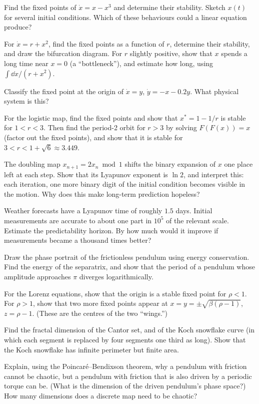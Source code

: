 \begin{problems}
\core Find the fixed points of $\dot x = x - x^3$ and determine their stability. Sketch $x(t)$ for several initial conditions. Which of these behaviours could a linear equation produce?

 For $\dot x = r + x^2$, find the fixed points as a function of $r$, determine their stability, and draw the bifurcation diagram. For $r$ slightly positive, show that $x$ spends a long time near $x = 0$ (a ``bottleneck''), and estimate how long, using $\int\dd x/(r+x^2)$.

 Classify the fixed point at the origin of $\dot x = y$, $\dot y = -x - 0.2y$. What physical system is this?

\core For the logistic map, find the fixed points and show that $x^* = 1-1/r$ is stable for $1<r<3$. Then find the period-2 orbit for $r>3$ by solving $F(F(x)) = x$ (factor out the fixed points), and show that it is stable for $3<r<1+\sqrt6\approx3.449$.

 The doubling map $x_{n+1} = 2x_n \bmod 1$ shifts the binary expansion of $x$ one place left at each step. Show that its Lyapunov exponent is $\ln 2$, and interpret this: each iteration, one more binary digit of the initial condition becomes visible in the motion. Why does this make long-term prediction hopeless?

 Weather forecasts have a Lyapunov time of roughly $1.5$ days. Initial measurements are accurate to about one part in $10^{5}$ of the relevant scale. Estimate the predictability horizon. By how much would it improve if measurements became a thousand times better?

 Draw the phase portrait of the frictionless pendulum using energy conservation. Find the energy of the separatrix, and show that the period of a pendulum whose amplitude approaches $\pi$ diverges logarithmically.

 For the Lorenz equations, show that the origin is a stable fixed point for $\rho<1$. For $\rho>1$, show that two more fixed points appear at $x = y = \pm\sqrt{\beta(\rho-1)}$, $z = \rho-1$. (These are the centres of the two ``wings.'')

 Find the fractal dimension of the Cantor set, and of the Koch snowflake curve (in which each segment is replaced by four segments one third as long). Show that the Koch snowflake has infinite perimeter but finite area.

\core Explain, using the Poincar\'e--Bendixson theorem, why a pendulum with friction cannot be chaotic, but a pendulum with friction that is also driven by a periodic torque can be. (What is the dimension of the driven pendulum's phase space?) How many dimensions does a discrete map need to be chaotic?


\end{problems}

